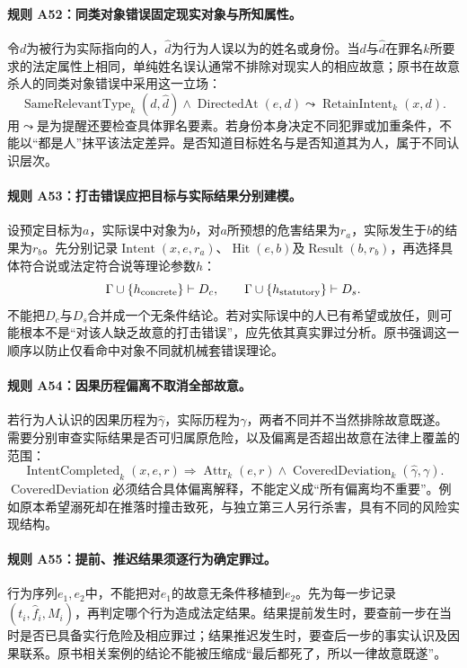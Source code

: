 \paragraph{规则 A52：同类对象错误固定现实对象与所知属性。}
令$d$为被行为实际指向的人，$\widehat d$为行为人误以为的姓名或身份。当$d$与$\widehat d$在罪名$k$所要求的法定属性上相同，单纯姓名误认通常不排除对现实人的相应故意；原书在故意杀人的同类对象错误中采用这一立场：
\[
\operatorname{SameRelevantType}_k(d,\widehat d)
\land\operatorname{DirectedAt}(e,d)
\leadsto\operatorname{RetainIntent}_k(x,d).
\]
用$\leadsto$是为提醒还要检查具体罪名要素。若身份本身决定不同犯罪或加重条件，不能以“都是人”抹平该法定差异。是否知道目标姓名与是否知道其为人，属于不同认识层次。

\paragraph{规则 A53：打击错误应把目标与实际结果分别建模。}
设预定目标为$a$，实际误中对象为$b$，对$a$所预想的危害结果为$r_a$，实际发生于$b$的结果为$r_b$。先分别记录$\operatorname{Intent}(x,e,r_a)$、$\operatorname{Hit}(e,b)$及$\operatorname{Result}(b,r_b)$，再选择具体符合说或法定符合说等理论参数$h$：
\[
\Gamma\cup\{h_{\rm concrete}\}\vdash D_c,
\qquad
\Gamma\cup\{h_{\rm statutory}\}\vdash D_s.
\]
不能把$D_c$与$D_s$合并成一个无条件结论。若对实际误中的人已有希望或放任，则可能根本不是“对该人缺乏故意的打击错误”，应先依其真实罪过分析。原书强调这一顺序以防止仅看命中对象不同就机械套错误理论。

\paragraph{规则 A54：因果历程偏离不取消全部故意。}
若行为人认识的因果历程为$\widehat\gamma$，实际历程为$\gamma$，两者不同并不当然排除故意既遂。需要分别审查实际结果是否可归属原危险，以及偏离是否超出故意在法律上覆盖的范围：
\[
\operatorname{IntentCompleted}_k(x,e,r)
\Longrightarrow\operatorname{Attr}_k(e,r)
\land\operatorname{CoveredDeviation}_k(\widehat\gamma,\gamma).
\]
$\operatorname{CoveredDeviation}$必须结合具体偏离解释，不能定义成“所有偏离均不重要”。例如原本希望溺死却在推落时撞击致死，与独立第三人另行杀害，具有不同的风险实现结构。

\paragraph{规则 A55：提前、推迟结果须逐行为确定罪过。}
行为序列$e_1,e_2$中，不能把对$e_1$的故意无条件移植到$e_2$。先为每一步记录$(t_i,\widehat f_i,M_i)$，再判定哪个行为造成法定结果。结果提前发生时，要查前一步在当时是否已具备实行危险及相应罪过；结果推迟发生时，要查后一步的事实认识及因果联系。原书相关案例的结论不能被压缩成“最后都死了，所以一律故意既遂”。


